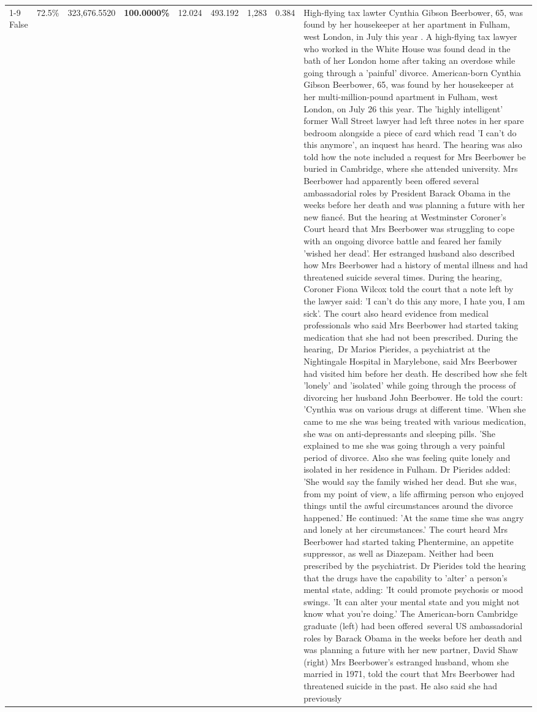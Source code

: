 \begin{table}[H]
\begin{tabular}{lllrlllll}
\cline{1-9}
False & 72.5\% & 323,676.5520 & \bfseries \color{red} 100.0000\% & 12.024 & 493.192 & 1,283 & 0.384 & High-flying tax lawter Cynthia Gibson Beerbower, 65, was found by her housekeeper at her apartment in Fulham, west London, in July this year . A high-flying tax lawyer who worked in the White House was found dead in the bath of her London home after taking an overdose while going through a 'painful' divorce. American-born Cynthia Gibson Beerbower, 65, was found by her housekeeper at her multi-million-pound apartment in Fulham, west London, on July 26 this year. The 'highly intelligent' former Wall Street lawyer had left three notes in her spare bedroom alongside a piece of card which read 'I can't do this anymore', an inquest has heard. The hearing was also told how the note included a request for Mrs Beerbower be buried in Cambridge, where she attended university. Mrs Beerbower had apparently been offered several ambassadorial roles by President Barack Obama in the weeks before her death and was planning a future with her new fiancé. But the hearing at Westminster Coroner's Court heard that Mrs Beerbower was struggling to cope with an ongoing divorce battle and feared her family 'wished her dead'. Her estranged husband also described how Mrs Beerbower had a history of mental illness and had threatened suicide several times. During the hearing, Coroner Fiona Wilcox told the court that a note left by the lawyer said: 'I can't do this any more, I hate you, I am sick'. The court also heard evidence from medical professionals who said Mrs Beerbower had started taking medication that she had not been prescribed. During the hearing, Dr Marios Pierides, a psychiatrist at the Nightingale Hospital in Marylebone, said Mrs Beerbower had visited him before her death. He described how she felt 'lonely' and 'isolated' while going through the process of divorcing her husband John Beerbower. He told the court: 'Cynthia was on various drugs at different time. 'When she came to me she was being treated with various medication, she was on anti-depressants and sleeping pills. 'She explained to me she was going through a very painful period of divorce. Also she was feeling quite lonely and isolated in her residence in Fulham. Dr Pierides added: 'She would say the family wished her dead. But she was, from my point of view, a life affirming person who enjoyed things until the awful circumstances around the divorce happened.' He continued: 'At the same time she was angry and lonely at her circumstances.' The court heard Mrs Beerbower had started taking Phentermine, an appetite suppressor, as well as Diazepam. Neither had been prescribed by the psychiatrist. Dr Pierides told the hearing that the drugs have the capability to 'alter' a person's mental state, adding: 'It could promote psychosis or mood swings. 'It can alter your mental state and you might not know what you're doing.' The American-born Cambridge graduate (left) had been offered several US ambassadorial roles by Barack Obama in the weeks before her death and was planning a future with her new partner, David Shaw (right) Mrs Beerbower's estranged husband, whom she married in 1971, told the court that Mrs Beerbower had threatened suicide in the past. He also said she had previously 
\end{tabular}
\end{table}
